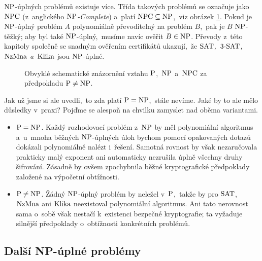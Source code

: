 \ensuremath{\classNP}-úplných problémů existuje více. Třída takových problémů se označuje jako \ensuremath{\classNPC} (z~anglického \emph{\ensuremath{\classNP}-Complete}) a~platí $\operatorname{NPC}\subseteq\operatorname{NP}$,~viz obrázek \ref{fig:vztah_p_np_npc}. Pokud je \ensuremath{\classNP}-úplný problém $A$ polynomiálně převoditelný na problém $B$,~pak je $B$ \ensuremath{\classNP}-těžký; aby byl také \ensuremath{\classNP}-úplný,~musíme navíc ověřit $B\in\operatorname{NP}$. Převody z~této kapitoly společně se snadným ověřením certifikátů ukazují,~že \emph{\ensuremath{\SAT},~\ensuremath{\THREESAT},~\ensuremath{\NZMNA} a~\ensuremath{\KLIKA}} jsou \ensuremath{\classNP}-úplné.
\begin{figure}[ht]
    \centering
    
    \caption{Obvyklé schematické znázornění vztahu \ensuremath{\classP},~\ensuremath{\classNP} a~\ensuremath{\classNPC} za předpokladu $\operatorname{P}\neq\operatorname{NP}$.}
    \label{fig:vztah_p_np_npc}
\end{figure}

Jak už jsme si ale uvedli,~to zda platí $\operatorname{P}=\operatorname{NP}$,~stále nevíme. Jaké by to ale mělo důsledky v~praxi? Pojďme se alespoň na chvilku zamyslet nad oběma variantami.
\begin{itemize}
    \item $\operatorname{P}=\operatorname{NP}$. Každý rozhodovací problém z~\ensuremath{\classNP} by měl polynomiální algoritmus a~u~mnoha běžných \ensuremath{\classNP}-úplných úloh bychom pomocí opakovaných dotazů dokázali polynomiálně nalézt i~řešení. Samotná rovnost by však nezaručovala prakticky malý exponent ani automaticky nezrušila úplně všechny druhy šifrování. Zásadně by ovšem zpochybnila běžné kryptografické předpoklady založené na výpočetní obtížnosti.
    \item $\operatorname{P}\neq\operatorname{NP}$. Žádný \ensuremath{\classNP}-úplný problém by neležel v~\ensuremath{\classP},~takže by pro \ensuremath{\SAT},~\ensuremath{\NZMNA} ani \ensuremath{\KLIKA} neexistoval polynomiální algoritmus. Ani tato nerovnost sama o~sobě však nestačí k~existenci bezpečné kryptografie; ta vyžaduje silnější předpoklady o~obtížnosti konkrétních problémů.
\end{itemize}

\subsection{Další NP-úplné problémy}\label{subsec:dalsi_npc}

